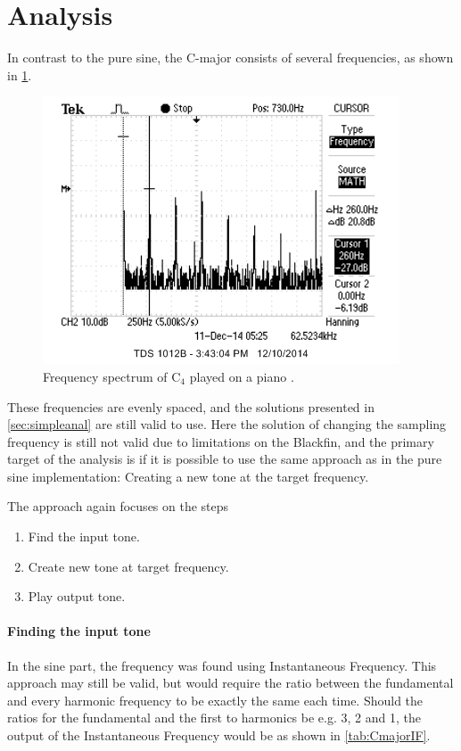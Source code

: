 
\section{Analysis}
In contrast to the pure sine, the C-major consists of several frequencies, as shown in \cref{fig:fftc4}.

\begin{figure}
	\centering
	\includegraphics[width=0.7\linewidth]{gfx/fft_C4.png}
	\caption{Frequency spectrum of C$_4$ played on a piano \cite{fft_c4}.}
	\label{fig:fftc4}
\end{figure}

These frequencies are evenly spaced, and the solutions presented in \cref{sec:simpleanal} are still valid to use.
Here the solution of changing the sampling frequency is still not valid due to limitations on the Blackfin, and the primary target of the analysis is if it is possible to use the same approach as in the pure sine implementation: Creating a new tone at the target frequency.

The approach again focuses on the steps
\begin{enumerate}
	\item Find the input tone.
	\item Create new tone at target frequency.
	\item Play output tone.
\end{enumerate}

\paragraph{Finding the input tone}
In the sine part, the frequency was found using Instantaneous Frequency.
This approach may still be valid, but would require the ratio between the fundamental and every harmonic frequency to be exactly the same each time.
Should the ratios for the fundamental and the first to harmonics be e.g. 3, 2 and 1, the output of the Instantaneous Frequency would be as shown in \cref{tab:CmajorIF}.

